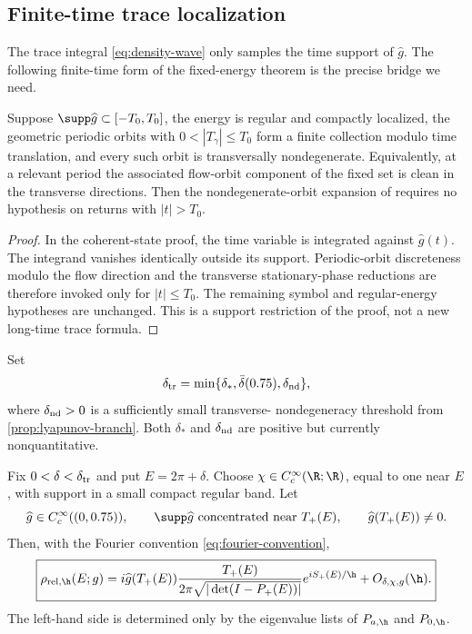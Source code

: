 \subsection{Finite-time trace localization}

The trace integral \cref{eq:density-wave} only samples the time support of
\(\widehat g\).  The following finite-time form of the fixed-energy theorem
is the precise bridge we need.

\begin{lemma}
\label{lem:finite-time-crr}
Suppose \(\supp\widehat g\subset[-T_0,T_0]\), the energy is regular and
compactly localized, the geometric periodic orbits with
\(0<|T_\gamma|\le T_0\) form a finite collection modulo time translation,
and every such orbit is transversally nondegenerate.  Equivalently, at a
relevant period the associated flow-orbit component of the fixed set is
clean in the transverse directions.  Then the nondegenerate-orbit expansion
of \citet{CombescureRalstonRobert1999} requires no hypothesis on returns with
\(|t|>T_0\).
\end{lemma}

\begin{proof}
In the coherent-state proof, the time variable is integrated against
\(\widehat g(t)\).  The integrand vanishes identically outside its support.
Periodic-orbit discreteness modulo the flow direction and the transverse
stationary-phase reductions are therefore invoked only for
\(|t|\le T_0\).  The remaining symbol and regular-energy hypotheses are
unchanged.  This is a support restriction of the proof, not a new long-time
trace formula.
\end{proof}

Set
\begin{equation}
 \delta_{\rm tr}
 =\min\{\delta_*,\bar\delta(0.75),\delta_{\rm nd}\},
 \label{eq:delta-tr}
\end{equation}
where \(\delta_{\rm nd}>0\) is a sufficiently small transverse-
nondegeneracy threshold from \cref{prop:lyapunov-branch}.  Both
\(\delta_*\) and \(\delta_{\rm nd}\) are positive but currently
nonquantitative.

\begin{theorem}
\label{thm:relative-gutzwiller}
Fix \(0<\delta<\delta_{\rm tr}\) and put \(E=2\pi+\delta\).  Choose
\(\chi\in C_c^\infty(\R;\R)\), equal to one near \(E\), with support in a
small compact regular band.  Let
\begin{equation}
 \widehat g\in C_c^\infty((0,0.75)),
 \qquad
 \supp\widehat g\ \text{concentrated near }T_+(E),
 \qquad
 \widehat g(T_+(E))\ne0.
 \label{eq:g-choice}
\end{equation}
Then, with the Fourier convention \cref{eq:fourier-convention},
\begin{equation}
 \boxed{
 \rho_{\mathrm{rel},\h}(E;g)
 =i\widehat g(T_+(E))
 \frac{T_+(E)}{2\pi\sqrt{|\det(I-P_+(E))|}}
 e^{iS_+(E)/\h}
 +O_{\delta,\chi,g}(\h).}
 \label{eq:main-trace-formula}
\end{equation}
The left-hand side is determined only by the eigenvalue lists of
\(P_{a,\h}\) and \(P_{0,\h}\).
\end{theorem}

